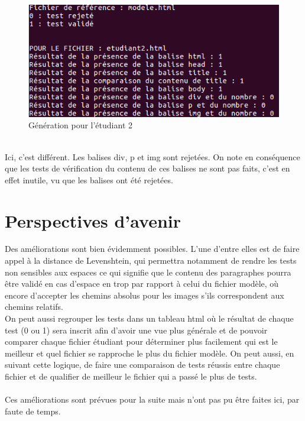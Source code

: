 \documentclass[12pt,twoside]{book}
\begin{document}
\begin{figure}[h]
\begin{center}
\includegraphics[width=120mm]{generationetudiant2.png}
\caption{Génération pour l'étudiant 2}
\label{fig:génération pour l'étudiant 2}
\end{center}
\end{figure}
\\Ici, c'est différent. Les balises div, p et img sont rejetées. On note en conséquence que les tests de vérification du contenu de ces balises ne sont pas faits, c'est en effet inutile, vu que les balises ont été rejetées. 
\section{Perspectives d'avenir}
Des améliorations sont bien évidemment possibles. L'une d'entre elles est de faire appel à la distance de Levenshtein, qui permettra notamment de rendre les tests non sensibles aux espaces ce qui signifie que le contenu des paragraphes pourra être validé en cas d'espace en trop par rapport à celui du fichier modèle, où encore d'accepter les chemins absolus pour les images s'ils correspondent aux chemins relatifs.\\
On peut aussi regrouper les tests dans un tableau html où le résultat de chaque test (0 ou 1) sera inscrit afin d'avoir une vue plus générale et de pouvoir comparer chaque fichier étudiant pour déterminer plus facilement qui est le meilleur et quel fichier se rapproche le plus du fichier modèle. On peut aussi, en suivant cette logique, de faire une comparaison de tests réussis entre chaque fichier et de qualifier de meilleur le fichier qui a passé le plus de tests.\\ \\
Ces améliorations sont prévues pour la suite mais n'ont pas pu être faites ici, par faute de temps.

\color{red}
\end{document}
